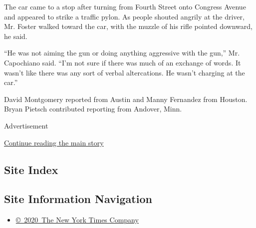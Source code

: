 The car came to a stop after turning from Fourth Street onto Congress
Avenue and appeared to strike a traffic pylon. As people shouted angrily
at the driver, Mr. Foster walked toward the car, with the muzzle of his
rifle pointed downward, he said.

``He was not aiming the gun or doing anything aggressive with the gun,''
Mr. Capochiano said. ``I'm not sure if there was much of an exchange of
words. It wasn't like there was any sort of verbal altercations. He
wasn't charging at the car.''

David Montgomery reported from Austin and Manny Fernandez from Houston.
Bryan Pietsch contributed reporting from Andover, Minn.

Advertisement

\protect\hyperlink{after-bottom}{Continue reading the main story}

\hypertarget{site-index}{%
\subsection{Site Index}\label{site-index}}

\hypertarget{site-information-navigation}{%
\subsection{Site Information
Navigation}\label{site-information-navigation}}

\begin{itemize}
\tightlist
\item
  \href{https://help.nytimes3xbfgragh.onion/hc/en-us/articles/115014792127-Copyright-notice}{©~2020~The
  New York Times Company}
\end{itemize}

